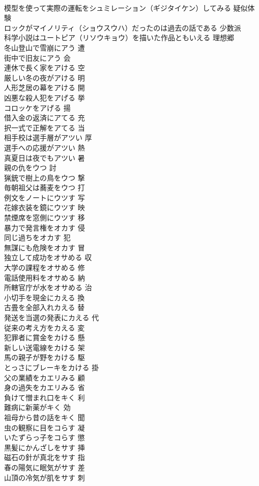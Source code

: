 \documentclass[8pt]{extreport}
\begin{document}
\begin{CJK}{UTF8}{min}
\\	模型を使って実際の運転をシュミレーション（ギジタイケン）してみる	疑似体験
\\	ロックがマイノリティ（ショウスウハ）だったのは過去の話である	少数派
\\	科学小説はユートピア（リソウキョウ）を描いた作品ともいえる	理想郷
\\	冬山登山で雪崩にアう	遭
\\	街中で旧友にアう	会
\\	連休で長く家をアける	空
\\	厳しい冬の夜がアける	明
\\	人形芝居の幕をアける	開
\\	凶悪な殺人犯をアげる	挙
\\	コロッケをアげる	揚
\\	借入金の返済にアてる	充
\\	択一式で正解をアてる	当
\\	相手校は選手層がアツい	厚
\\	選手への応援がアツい	熱
\\	真夏日は夜でもアツい	暑
\\	親の仇をウつ	討
\\	猟銃で樹上の鳥をウつ	撃
\\	毎朝祖父は蕎麦をウつ	打
\\	例文をノートにウツす	写
\\	花嫁衣装を鏡にウツす	映
\\	禁煙席を窓側にウツす	移
\\	暴力で発言権をオカす	侵
\\	同じ過ちをオカす	犯
\\	無謀にも危険をオカす	冒
\\	独立して成功をオサめる	収
\\	大学の課程をオサめる	修
\\	電話使用料をオサめる	納
\\	所轄官庁が水をオサめる	治
\\	小切手を現金にカえる	換
\\	古畳を全部入れカえる	替
\\	発送を当選の発表にカえる	代
\\	従来の考え方をカえる	変
\\	犯罪者に賞金をカける	懸
\\	新しい送電線をカける	架
\\	馬の親子が野をカける	駆
\\	とっさにブレーキをカける	掛
\\	父の業績をカエリみる	顧
\\	身の過失をカエリみる	省
\\	負けて憎まれ口をキく	利
\\	難病に新薬がキく	効
\\	祖母から昔の話をキく	聞
\\	虫の観察に目をコらす	凝
\\	いたずらっ子をコらす	懲
\\	黒髪にかんざしをサす	挿
\\	磁石の針が真北をサす	指
\\	春の陽気に眠気がサす	差
\\	山頂の冷気が肌をサす	刺
\end{CJK}
\end{document}
